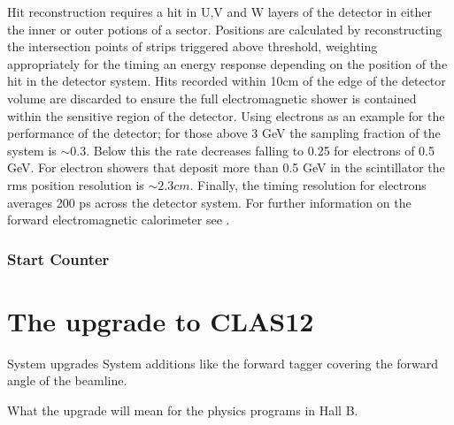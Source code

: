 Hit reconstruction requires a hit in U,V and W layers of the detector in either the inner or outer potions of a sector. Positions are calculated by reconstructing the intersection points of strips triggered above threshold, weighting appropriately for the timing an energy response depending on the position of the hit in the detector system. Hits recorded within 10cm of the edge of the detector volume are discarded to ensure the full electromagnetic shower is contained within the sensitive region of the detector. Using electrons as an example for the performance of the detector; for those above 3 GeV the sampling fraction of the system is $\sim 0.3$. Below this the rate decreases falling to 0.25 for electrons of 0.5 GeV. For electron showers that deposit more than 0.5 GeV in the scintillator the rms position resolution is $\sim 2.3 cm$. Finally, the timing resolution for electrons averages 200 ps across the detector system. For further information on the forward electromagnetic calorimeter see \cite{amarian2001clas}.

\subsubsection{Start Counter}


\section{The upgrade to CLAS12}
System upgrades
System additions like the forward tagger covering the forward angle of the beamline.

What the upgrade will mean for the physics programs in Hall B.